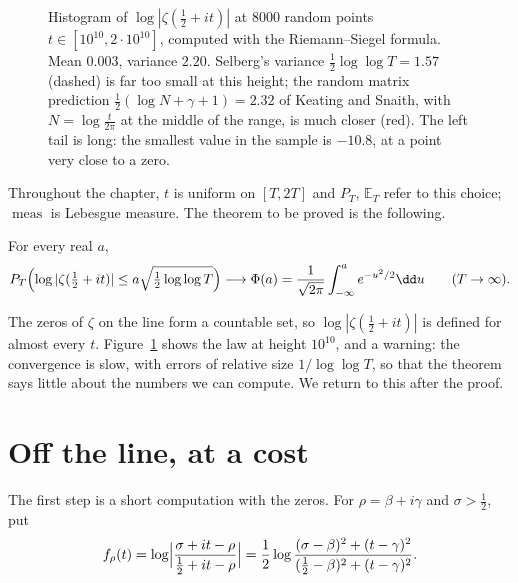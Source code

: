 \begin{figure}[ht]
\centering{}
\caption{Histogram of $\log|\zeta(\frac12+it)|$ at $8000$ random points $t\in[10^{10},2\cdot10^{10}]$, computed with the Riemann--Siegel formula. Mean $0.003$, variance $2.20$. Selberg's variance $\frac12\log\log T=1.57$ (dashed) is far too small at this height; the random matrix prediction $\frac12(\log N+\gamma+1)=2.32$ of Keating and Snaith, with $N=\log\frac t{2\pi}$ at the middle of the range, is much closer (red). The left tail is long: the smallest value in the sample is $-10.8$, at a point very close to a zero.}
\label{fig:selberghist}
\end{figure}

Throughout the chapter, $t$ is uniform on $[T,2T]$ and $P_T$, $\mathbb E_T$ refer to this choice; $\operatorname{meas}$ is Lebesgue measure. The theorem to be proved is the following.

\begin{theorem}[Selberg, 1946]\label{thm:selberg}
For every real $a$,
\[
P_T\Bigl(\log|\zeta(\tfrac12+it)|\le a\sqrt{\tfrac12\log\log T}\Bigr)\longrightarrow\Phi(a)=\frac1{\sqrt{2\pi}}\int_{-\infty}^ae^{-u^2/2}\dd u\qquad(T\to\infty).
\]
\end{theorem}

The zeros of $\zeta$ on the line form a countable set, so $\log|\zeta(\frac12+it)|$ is defined for almost every $t$. Figure~\ref{fig:selberghist} shows the law at height $10^{10}$, and a warning: the convergence is slow, with errors of relative size $1/\log\log T$, so that the theorem says little about the numbers we can compute. We return to this after the proof.

\section{Off the line, at a cost}

The first step is a short computation with the zeros. For $\rho=\beta+i\gamma$ and $\sigma>\frac12$, put
\[
f_\rho(t)=\log\Bigl|\frac{\sigma+it-\rho}{\frac12+it-\rho}\Bigr|=\frac12\log\frac{(\sigma-\beta)^2+(t-\gamma)^2}{(\frac12-\beta)^2+(t-\gamma)^2}.
\]

